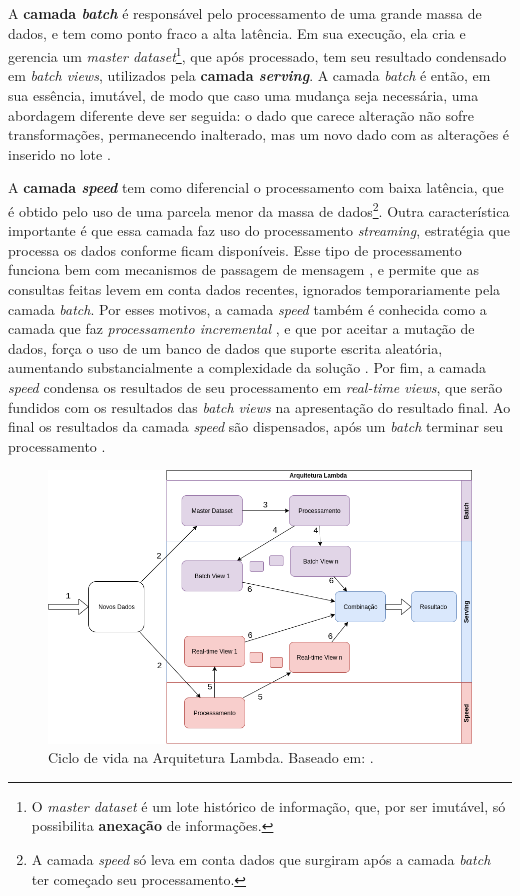 A \textbf{camada \textit{batch}} é responsável pelo processamento de uma grande
massa de dados, e tem como ponto fraco a alta latência. Em sua execução, ela
cria e gerencia um \textit{master dataset}\footnote{O \textit{master dataset} é um lote
histórico de informação, que, por ser imutável, só possibilita \textbf{anexação}
de informações.}, que após processado, tem seu resultado condensado em
\textit{batch views}, utilizados pela \textbf{camada \textit{serving}}.
A camada \textit{batch} é então, em sua essência, imutável, de modo que caso
uma mudança seja necessária, uma abordagem diferente deve ser seguida: o dado
que carece alteração não sofre transformações, permanecendo inalterado, mas um
novo dado com as alterações é inserido no lote \cite{marz2015}.

A \textbf{camada \textit{speed}} tem como diferencial o processamento com baixa
latência, que é obtido pelo uso de uma parcela menor da massa de dados\footnote{
A camada \textit{speed} só leva em conta dados que surgiram após a camada
\textit{batch} ter começado seu processamento.}. Outra característica importante
é que essa camada faz uso do processamento \textit{streaming}, estratégia que
processa os dados conforme ficam disponíveis. Esse tipo de
processamento funciona bem com mecanismos de passagem de mensagem
\cite{marz2015}, e permite que as consultas feitas levem em conta dados
recentes, ignorados temporariamente pela camada \textit{batch}. Por esses
motivos, a camada \textit{speed} também é conhecida como a camada que faz
\textit{processamento incremental} \cite{marz2015}, e que por aceitar a mutação
de dados, força o uso de um banco de dados que suporte escrita aleatória,
aumentando substancialmente a complexidade da solução \cite{marz2015}. Por
fim, a camada \textit{speed} condensa os resultados de seu processamento em
\textit{real-time views}, que serão fundidos com os resultados das
\textit{batch views} na apresentação do resultado final. Ao final os resultados
da camada \textit{speed} são dispensados, após um \textit{batch} terminar seu
processamento \cite{marz2015}.

\begin{figure}
  \centering
    \includegraphics[width=\textwidth]{figuras/lambda-lifecycle.png}
    \caption{Ciclo de vida na Arquitetura Lambda. Baseado em: .}
  \label{fig:lambda-lifecycle}
\end{figure}

